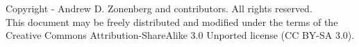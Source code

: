 Copyright -\the\year{} Andrew D. Zonenberg and contributors. All rights reserved. \\

This document may be freely distributed and modified under the terms of the Creative Commons Attribution-ShareAlike 3.0
Unported license (CC BY-SA 3.0).
